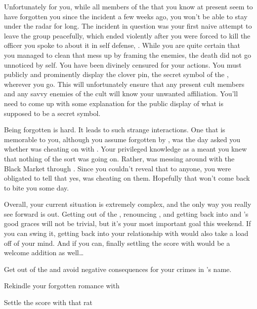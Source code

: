 \documentclass[char]{GL2020}
\begin{document}
Unfortunately for you, while all members of the \pGoaties{} that you know at present seem to have forgotten you since the incident a few weeks ago, you won’t be able to stay under the radar for long. The incident in question was your first naive attempt to leave the group peacefully, which ended violently after you were forced to kill the officer you spoke to about it in self defense, \cJoeKill{}. While you are quite certain that you managed to clean that mess up by framing the \pGoaties{} enemies, the death did not go unnoticed by \cGenesis{} \cGenesis{\them}self. You have been divinely censured for your actions. You must publicly and prominently display the clover pin, the secret symbol of the \pGoaties{}, wherever you go. This will unfortunately ensure that any present cult members and any savvy enemies of the cult will know your unwanted affiliation. You’ll need to come up with some explanation for the public display of what is supposed to be a secret symbol.

Being forgotten is hard. It leads to such strange interactions. One that is memorable to you, although you assume forgotten by \cLibrarian{\them}, was the day \cLibrarian{} asked you whether \cEthics{} was cheating on \cLibrarian{} with \cChupSecond{}. Your privileged knowledge as a \pGoaties{} meant you knew that nothing of the sort was going on. Rather, \cEthics{} was messing around with the Black Market through \cChupSecond{}. Since you couldn’t reveal that to anyone, you were obligated to tell \cLibrarian{} that yes, \cEthics{} was cheating on them. Hopefully that won’t come back to bite you some day.

Overall, your current situation is extremely complex, and the only way you really see forward is out. Getting out of the \pGoaties{}, renouncing \cGenesis{}, and getting back into \cEbb{} and \cFlow{}’s good graces will not be trivial, but it’s your most important goal this weekend. If you can swing it, getting back into your relationship with \cHeadScientist{} would also take a load off of your mind. And if you can, finally settling the score with \cDiplomat{} would be a welcome addition as well\ldots

\begin{itemz}[Goals]
	\item Get out of the \pGoaties{} and avoid negative consequences for your crimes in \cGenesis{}’s name.
	\item Rekindle your forgotten romance with \cHeadScientist{}
	\item Settle the score with that rat \cDiplomat{}
\end{itemz}
\end{document}
